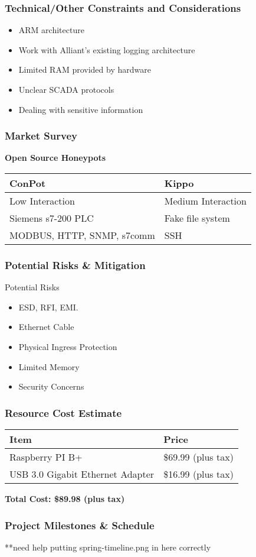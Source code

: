\begin{frame}
\frametitle{Technical/Other Constraints and Considerations}

\begin{itemize}
\item ARM architecture
\item Work with Alliant's existing logging architecture
\item Limited RAM provided by hardware
\item Unclear SCADA protocols
\item Dealing with sensitive information
\end{itemize}

\end{frame}

\begin{frame}
\frametitle{Market Survey}
\begin{center}
\textbf{Open Source Honeypots}
\begin{tabular}{l | l}
\toprule
\textbf{ConPot} & \textbf{Kippo} \\
\midrule
Low Interaction & Medium Interaction \\
Siemens s7-200 PLC & Fake file system \\
MODBUS, HTTP, SNMP, s7comm & SSH \\
\bottomrule
\end{tabular}
\end{center}

\end{frame}

\begin{frame}
\frametitle{Potential Risks \& Mitigation}

\huge Potential Risks \medskip
\normalsize
\begin{itemize}
    \item ESD, RFI, EMI.
    \item Ethernet Cable
    \item Physical Ingress Protection
    \item Limited Memory
    \item Security Concerns
\end{itemize}

\end{frame}

\begin{frame}
\frametitle{Resource Cost Estimate}

\begin{center}

\begin{tabular}{l | l}
\toprule
\textbf{Item} & \textbf{Price} \\
\midrule
Raspberry PI B+ & \$69.99 (plus tax) \\
USB 3.0 Gigabit Ethernet Adapter & \$16.99 (plus tax) \\
\bottomrule
\end{tabular}

\hfill \break
\textbf{Total Cost: \$89.98 (plus tax)}
\end{center}


\end{frame}

\begin{frame}
\frametitle{Project Milestones \& Schedule}

**need help putting spring-timeline.png in here correctly

\end{frame}
